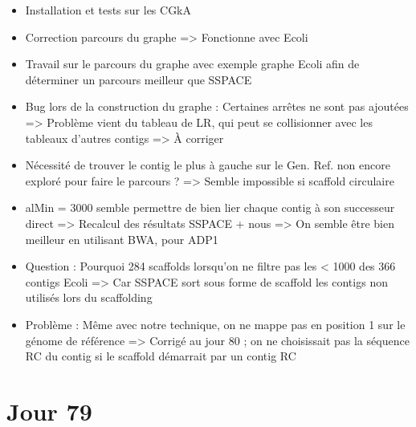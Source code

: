 \documentclass[12pt]{report}
\begin{document}
\begin{itemize}
	\item Installation et tests sur les CGkA
	
	\item Correction parcours du graphe => Fonctionne avec Ecoli

	\item Travail sur le parcours du graphe avec exemple graphe Ecoli afin de déterminer un parcours meilleur que SSPACE
	
	\item Bug lors de la construction du graphe : Certaines arrêtes ne sont pas ajoutées => Problème vient du tableau de LR, qui
		  peut se collisionner avec les tableaux d'autres contigs => À corriger
		  
	\item Nécessité de trouver le contig le plus à gauche sur le Gen. Ref. non encore exploré pour faire le parcours ?
		  => Semble impossible si scaffold circulaire
	
	\item alMin = 3000 semble permettre de bien lier chaque contig à son successeur direct => Recalcul des résultats SSPACE + nous
		  => On semble être bien meilleur en utilisant BWA, pour ADP1
	
	\item Question : Pourquoi 284 scaffolds lorsqu'on ne filtre pas les < 1000 des 366 contigs Ecoli => Car SSPACE sort sous forme
		  de scaffold les contigs non utilisés lors du scaffolding
	
	\item Problème : Même avec notre technique, on ne mappe pas en position 1 sur le génome de référence
		  => Corrigé au jour 80 ; on ne choisissait pas la séquence RC du contig si le scaffold démarrait par un contig RC
\end{itemize}

\section{Jour 79}
\end{document}

